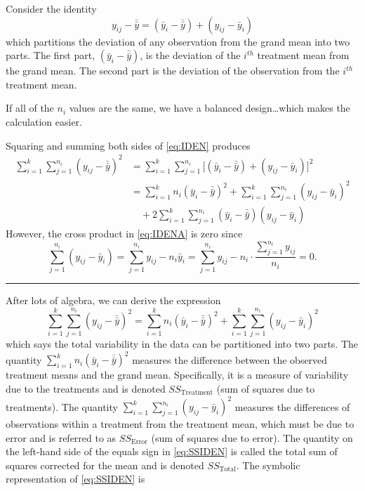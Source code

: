 \documentclass[
]{article}
\begin{document}
Consider the identity
\begin{equation}
y_{ij} - \bar{\bar{y}} = (\bar{y}_i - \bar{\bar{y}}) + (y_{ij} -
\bar{y}_i)
\label{eq:IDEN}
\end{equation}
which partitions the deviation of any observation from the grand mean into two parts. The first part, \((\bar{y}_i - \bar{\bar{y}})\), is the deviation of the \(i^{th}\) treatment mean from the grand mean. The second part is the deviation of the observation from the \(i^{th}\) treatment mean.

If all of the \(n_i\) values are the same, we have a balanced design\ldots which makes the calculation easier.

Squaring and summing both sides of \eqref{eq:IDEN} produces
\begin{align}
\sum_{i=1}^{k} \sum_{j=1}^{n_i} (y_{ij} - \bar{\bar{y}})^2 &=
\sum_{i=1}^{k} \sum_{j=1}^{n_i} \bigl[ (\bar{y}_i -
\bar{\bar{y}}) + (y_{ij} - \bar{y}_i)\bigr]^2\nonumber\\
&= \sum_{i=1}^k n_i (\bar{y}_i -
\bar{\bar{y}})^2 + \sum_{i=1}^{k} \sum_{j=1}^{n_i} (y_{ij} - \bar{y}_i)^2 \nonumber\\
&\quad+ 2 \sum_{i=1}^{k} \sum_{j=1}^{n_i} (\bar{y}_i -
\bar{\bar{y}})(y_{ij} - \bar{y}_i)
\label{eq:IDENA}
\end{align}
However, the cross product in \eqref{eq:IDENA} is zero since
\begin{equation*}
\sum_{j=1}^{n_i} (y_{ij} - \bar{y}_i) = \sum_{j=1}^{n_i} y_{ij} - n_i\bar{y}_i =
\sum_{j=1}^{n_i} y_{ij} - n_i \cdot \frac{\sum_{j=1}^{n_i} y_{ij}}{n_i} = 0.
\end{equation*}

\begin{center}\rule{0.5\linewidth}{0.5pt}\end{center}

After lots of algebra, we can derive the expression
\begin{equation}
\sum_{i=1}^{k} \sum_{j=1}^{n_i} (y_{ij} - \bar{\bar{y}})^2 =\sum_{i=1}^k
n_i (\bar{y}_i - \bar{\bar{y}})^2 + \sum_{i=1}^{k} \sum_{j=1}^{n_i}
(y_{ij} - \bar{y}_i)^2
\label{eq:SSIDEN}
\end{equation}
which says the total variability in the data can be partitioned into two parts. The quantity \(\sum_{i=1}^k n_i (\bar{y}_i - \bar{\bar{y}})^2\) measures the difference between the observed treatment means and the grand mean. Specifically, it is a measure of variability due to the treatments and is denoted \(SS_\text{Treatment}\) (sum of squares due to treatments). The quantity \(\sum_{i=1}^{k} \sum_{j=1}^{n_i} (y_{ij} - \bar{y}_i)^2\) measures the differences of observations within a treatment from the treatment mean, which must be due to error and is referred to as \(SS_\text{Error}\) (sum of squares due to error). The quantity on the left-hand side of the equals sign in \eqref{eq:SSIDEN} is called the total sum of squares corrected for the mean and is denoted \(SS_\text{Total}\). The symbolic representation of \eqref{eq:SSIDEN} is
\end{document}
